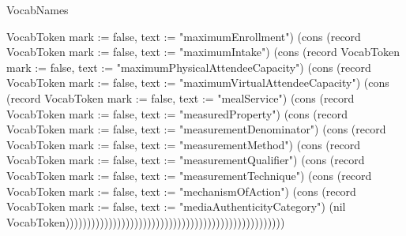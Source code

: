 \begin{lexlean}{VocabNames}
\begin{semanticmodule}
{VocabToken {mark := false, text := "maximumEnrollment"}) (cons (record VocabToken {mark := false, text := "maximumIntake"}) (cons (record VocabToken {mark := false, text := "maximumPhysicalAttendeeCapacity"}) (cons (record VocabToken {mark := false, text := "maximumVirtualAttendeeCapacity"}) (cons (record VocabToken {mark := false, text := "mealService"}) (cons (record VocabToken {mark := false, text := "measuredProperty"}) (cons (record VocabToken {mark := false, text := "measurementDenominator"}) (cons (record VocabToken {mark := false, text := "measurementMethod"}) (cons (record VocabToken {mark := false, text := "measurementQualifier"}) (cons (record VocabToken {mark := false, text := "measurementTechnique"}) (cons (record VocabToken {mark := false, text := "mechanismOfAction"}) (cons (record VocabToken {mark := false, text := "mediaAuthenticityCategory"}) (nil VocabToken)))))))))))))))))))))))))))))))))))))))))))))))))))
}


\end{semanticmodule}
\end{lexlean}
